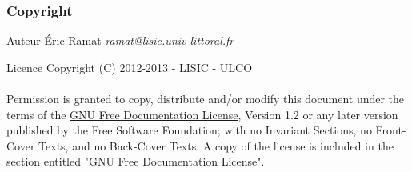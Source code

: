 \begin{frame}
  \frametitle{Copyright}

  \begin{alertblock}{Auteur}
    \href{mailto:ramat@lisic.univ-littoral.fr}
         {\'Eric Ramat \emph{ramat@lisic.univ-littoral.fr}}\\
  \end{alertblock}

  \begin{alertblock}{Licence}
    Copyright (C) 2012-2013 - LISIC - ULCO\\~\\

    Permission is granted to copy, distribute and/or modify this document under
    the terms of the \href{http://www.gnu.org/licenses/fdl.txt}{GNU Free
      Documentation License}, Version 1.2 or any later
    version published by the Free Software Foundation; with no Invariant
    Sections, no Front-Cover Texts, and no Back-Cover Texts.  A copy of the
    license is included in the section entitled "GNU Free Documentation
    License".
  \end{alertblock}
\end{frame}
